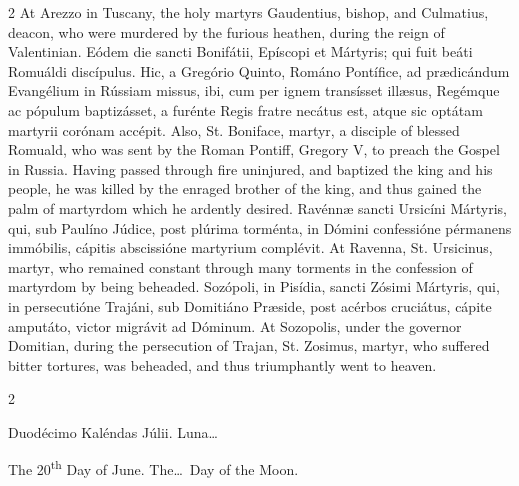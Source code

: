 \begin{paracol}{2}
\switchcolumn
{}
At Arezzo in Tuscany, the holy 
 martyrs Gaudentius, bishop, and Culmatius, deacon, who were murdered by the 
 furious heathen, during the reign of Valentinian.
\switchcolumn*
{}
Eódem die sancti 
 Bonifátii, Epíscopi et Mártyris; qui fuit beáti Romuáldi discípulus. 
 Hic, a Gregório Quinto, Románo Pontífice, ad prædicándum Evangélium in 
 Rússiam missus, ibi, cum per ignem transísset illæsus, Regémque ac pópulum 
 baptizásset, a furénte Regis fratre necátus est, atque sic optátam martyrii 
 corónam accépit.
\switchcolumn
{}
Also, St. Boniface, martyr, a 
 disciple of blessed Romuald, who was sent by the Roman Pontiff, Gregory V, 
 to preach the Gospel in Russia. Having passed through fire uninjured, 
 and baptized the king and his people, he was killed by the enraged brother 
 of the king, and thus gained the palm of martyrdom which he ardently 
 desired.
\switchcolumn*
{}
Ravénnæ sancti Ursicíni 
 Mártyris, qui, sub Paulíno Júdice, post plúrima torménta, in Dómini 
 confessióne pérmanens immóbilis, cápitis abscissióne martyrium complévit.
\switchcolumn
{}
At Ravenna, St. Ursicinus, martyr, 
 who remained constant through many torments in the confession of martyrdom 
 by being beheaded.
\switchcolumn*
{}
Sozópoli, in Pisídia, 
 sancti Zósimi Mártyris, qui, in persecutióne Trajáni, sub Domitiáno Præside, 
 post acérbos cruciátus, cápite amputáto, victor migrávit ad Dóminum.
\switchcolumn
{}
At Sozopolis, under the governor 
 Domitian, during the persecution of Trajan, St. Zosimus, martyr, who 
 suffered bitter tortures, was beheaded, and thus triumphantly went to 
 heaven.
\switchcolumn*
{}
\end{paracol}


\begin{paracol}{2}
\begin{center}{\color{gregoriocolor} Duodécimo Kaléndas Júlii. 
 Luna\dots\ }\end{center}
\switchcolumn
{}
\begin{center}{\color{gregoriocolor} The 
 20\textsuperscript{th} Day of 
 June. The\dots\ Day of the Moon.}\end{center}
\end{paracol}

